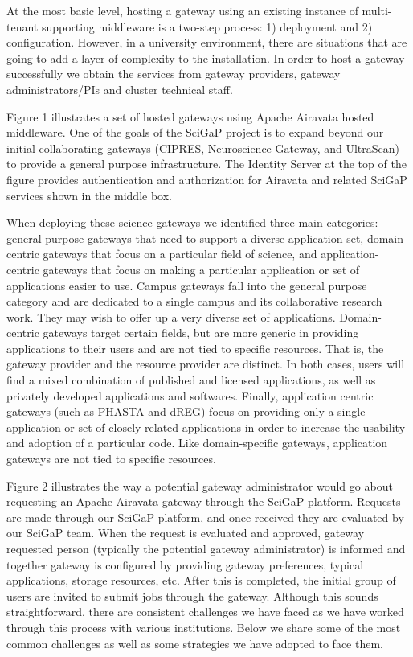 \documentclass[sigconf]{acmart}
\begin{document}
At the most basic level, hosting a gateway using an existing instance of multi-tenant supporting middleware is a two-step process: 1) deployment and 2) configuration.  However, in a university environment, there are situations that are going to add a layer of complexity to the installation. In order to host a gateway successfully we obtain the services from gateway providers, gateway administrators/PIs and cluster technical staff.  

Figure 1 illustrates a set of hosted gateways using Apache Airavata hosted middleware. One of the goals of the SciGaP project is to expand beyond our initial collaborating gateways (CIPRES, Neuroscience Gateway, and UltraScan) to provide a general purpose infrastructure.  The Identity Server \cite{nakandala2016apache} at the top of the figure provides authentication and authorization for Airavata and related SciGaP services shown in the middle box. 

When deploying these science gateways we identified three main categories:  general purpose gateways that need to support a diverse application set, domain-centric gateways that focus on a particular field of science, and application-centric gateways that focus on making a particular application or set of applications easier to use. Campus gateways fall into the general purpose category and are dedicated to a single campus and its collaborative research work. They may wish to offer up a very diverse set of applications.  Domain-centric gateways target  certain fields, but are more generic in providing applications to their users and are not tied to specific resources. That is, the gateway provider and the resource provider are distinct. In both cases, users will find a mixed combination of published and licensed applications, as well as privately developed applications and softwares. Finally, application centric gateways (such as PHASTA and dREG) focus on providing only a single application or set of closely related applications in order to increase the usability and adoption of a particular code. Like domain-specific gateways, application gateways are not tied to specific resources. 

Figure 2 illustrates the way a potential gateway administrator would go about requesting an Apache Airavata gateway through the SciGaP platform.  Requests are made through our SciGaP platform, and once received they are evaluated by our SciGaP team.  When the request is evaluated and  approved, gateway requested person  (typically the potential gateway administrator) is informed and together gateway is configured by providing gateway preferences, typical applications, storage resources, etc.  After this is completed, the initial group of users are invited to submit jobs through the gateway.  Although this sounds straightforward, there are consistent challenges we have faced as we have worked through this process with various institutions.  Below we share some of the most common challenges as well as some strategies we have adopted to face them. 
\end{document}
